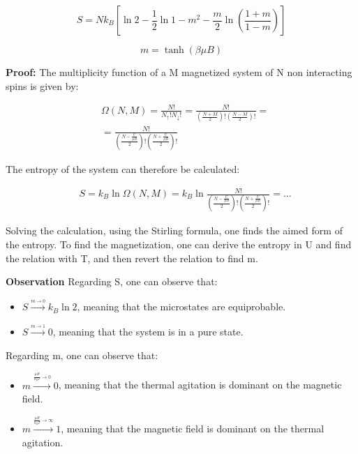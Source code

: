 \documentclass{article}
\begin{document}
\begin{tcolorbox}[colframe=gray!50, colback=gray!10, coltitle=black, title=S and m for a non interacting spin system]

    \begin{equation}
        S=Nk_B\left[\ln{2} -\frac{1}{2}\ln{1-m^2}-\frac{m}{2}\ln{\left(\frac{1+m}{1-m}\right)} \right]
    \end{equation}

    \begin{equation}
        m=\tanh{\left(\beta \mu B\right)}
    \end{equation}

\end{tcolorbox}

\textbf{Proof:}
The multiplicity function of a M magnetized system of N non interacting spins is given by:

\begin{align*}
     & \Omega(N,M)=\frac{N!}{N_{\uparrow}!N_{\downarrow}!}= \frac{N!}{\left( \frac{N+M}{2} \right)!\left( \frac{N-M}{2} \right)!}= \\
     & =\frac{N!}{\left(\frac{N-\frac{U}{\mu B}}{2}\right)! \left(\frac{N+\frac{U}{\mu B}}{2}\right)!}
\end{align*}

The entropy of the system can therefore be calculated:

\begin{align*}
     & S=k_B\ln{\Omega(N,M)}=k_B\ln{\frac{N!}{\left(\frac{N-\frac{U}{\mu B}}{2}\right)! \left(\frac{N+\frac{U}{\mu B}}{2}\right)!}}=...
\end{align*}

Solving the calculation, using the Stirling formula, one finds the aimed form of the entropy.
To find the magnetization, one can derive the entropy in U and find the relation with T, and then revert the relation to find m.

\textbf{Observation}
Regarding S, one can observe that:
\begin{itemize}
    \item $ S \xrightarrow{\underset{m \to 0}{}} k_B \ln{2} $, meaning that the microstates are equiprobable.
    \item $ S \xrightarrow{\underset{m \to 1}{}} 0 $, meaning that the system is in a pure state.
\end{itemize}

Regarding m, one can observe that:
\begin{itemize}
    \item $ m \xrightarrow{\underset{\frac{\mu B}{k_B T} \to 0}{}} 0 $, meaning that the thermal agitation is dominant on the magnetic field.
    \item $ m \xrightarrow{\underset{\frac{\mu B}{k_B T} \to \infty}{}} 1 $, meaning that the magnetic field is dominant on the thermal agitation.
\end{itemize}
\end{document}
